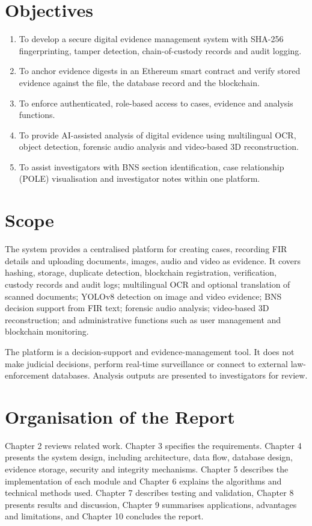 \documentclass[12pt,a4paper,oneside]{report}
\begin{document}
\section{Objectives}
\begin{enumerate}
  \item To develop a secure digital evidence management system with SHA-256 fingerprinting, tamper detection, chain-of-custody records and audit logging.
  \item To anchor evidence digests in an Ethereum smart contract and verify stored evidence against the file, the database record and the blockchain.
  \item To enforce authenticated, role-based access to cases, evidence and analysis functions.
  \item To provide AI-assisted analysis of digital evidence using multilingual OCR, object detection, forensic audio analysis and video-based 3D reconstruction.
  \item To assist investigators with BNS section identification, case relationship (POLE) visualisation and investigator notes within one platform.
\end{enumerate}

\section{Scope}
The system provides a centralised platform for creating cases, recording FIR details and uploading documents, images, audio and video as evidence. It covers hashing, storage, duplicate detection, blockchain registration, verification, custody records and audit logs; multilingual OCR and optional translation of scanned documents; YOLOv8 detection on image and video evidence; BNS decision support from FIR text; forensic audio analysis; video-based 3D reconstruction; and administrative functions such as user management and blockchain monitoring.

The platform is a decision-support and evidence-management tool. It does not make judicial decisions, perform real-time surveillance or connect to external law-enforcement databases. Analysis outputs are presented to investigators for review.

\section{Organisation of the Report}
Chapter 2 reviews related work. Chapter 3 specifies the requirements. Chapter 4 presents the system design, including architecture, data flow, database design, evidence storage, security and integrity mechanisms. Chapter 5 describes the implementation of each module and Chapter 6 explains the algorithms and technical methods used. Chapter 7 describes testing and validation, Chapter 8 presents results and discussion, Chapter 9 summarises applications, advantages and limitations, and Chapter 10 concludes the report.
\end{document}
